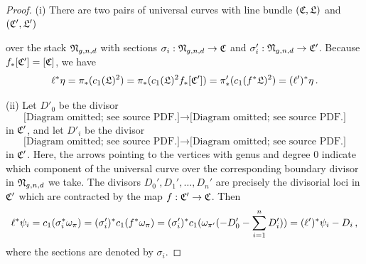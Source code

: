 \begin{proof}

(i) There are two pairs of universal curves with line bundle $(\frak C,\frak L)$ and $(\frak C', \frak L')$


over the stack $\frak{N}_{g,n,d}$ with sections $\sigma_i:\frak N_{g,n,d}\to\frak C$ and $\sigma_i':\frak N_{g,n,d}\to \frak C'$. Because $f_*[\frak C'] = [\frak C]$, we have
\[
\ell^*\eta = \pi_*(c_1(\frak L)^2) = \pi_*(c_1(\frak L)^2f_*[\frak C']) = \pi'_*(c_1(f^*\frak L)^2) = (\ell')^*\eta\, .
\]

 (ii) Let $D'_0$ be the divisor
\[
\text{[Diagram omitted; see source PDF.]}
\to
\text{[Diagram omitted; see source PDF.]}
\]
in $\frak C'$, and let $D'_i$ be the divisor
\[
\text{[Diagram omitted; see source PDF.]}
\to
\text{[Diagram omitted; see source PDF.]}
\]
in $\frak C'$. Here, the arrows pointing to the vertices with genus and degree $0$ indicate which component of the universal curve over the corresponding boundary divisor in $\frak N_{g,n,d}$ we take. The divisors $D_0', D_1', \ldots, D_n'$ are precisely the divisorial loci in $\frak C'$ which are contracted by the map $f: \frak C' \to \frak C$.
Then
\[
\ell^*\psi_i = c_1(\sigma_i^*\omega_\pi)= ({\sigma}_i')^*c_1(f^*\omega_\pi) = ({\sigma}_i')^* c_1(\omega_{\pi'}(-D'_0-\sum_{i=1}^n D'_i)) = (\ell')^*\psi_i - D_i\, ,
\]
where the sections are denoted by $\sigma_i$.
\end{proof}
